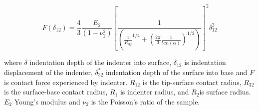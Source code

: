 \begin{equation}  F(\delta_{12}) =  \frac{4}{3} \frac{E_2}{(1-\nu_2^2)} \left[ \frac{1}{\left(\frac{1}{R_{32}}^{1/4} + (\frac{2\pi}{3}\frac{1}{tan(\alpha)})^{1/2} \right)} \right]^{2}\delta_{12}^{2}\label{eq: Sneddon Double Contact} \end{equation} 

where $\delta$ indentation depth of the indenter into surface, $\delta_{12}$ is indentation displacement of the indenter, $\delta^*_{32}$ indentation depth of the surface into base and $F$ is contact force experienced by indenter. $R_{12}$ is the tip-surface contact radius, $R_{32}$ is the surface-base contact radius, $R_1$ is indenter radius, and $R_2$is surface radius. $E_2$ Young’s modulus and $\nu_2$ is the Poisson’s ratio of the sample.
